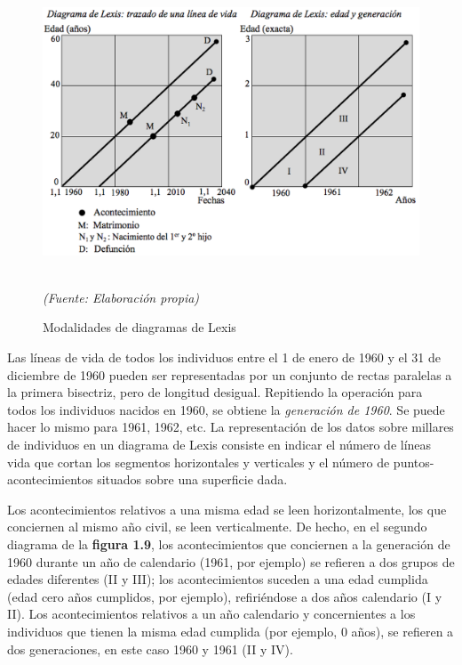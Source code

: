 \begin{figure}[!ht]
\centering
\includegraphics[scale=0.48]{Cap1/diagrlexis.png}
\caption{Modalidades de diagramas de Lexis}\\
\textit{(Fuente: Elaboraci\'on propia)}
\end{figure}

Las l\'ineas de vida de todos los individuos entre el 1 de enero de 1960 y el 31 de diciembre de 1960 pueden ser representadas por un conjunto de rectas paralelas a la primera bisectriz, pero de longitud desigual. Repitiendo la operaci\'on para todos los individuos nacidos en 1960, se obtiene la \textit{generaci\'on de 1960}. Se puede hacer lo mismo para 1961, 1962, etc. La representaci\'on de los datos sobre millares de individuos en un diagrama de Lexis consiste en indicar el n\'umero de l\'ineas vida que cortan los segmentos horizontales y verticales y el n\'umero de puntos-acontecimientos situados sobre una superficie dada.\\

\vspace{-0.3cm}

Los acontecimientos relativos a una misma edad se leen horizontalmente, los que conciernen al mismo a\~no civil, se leen verticalmente. De hecho, en el segundo diagrama de la \textbf{figura 1.9}, los acontecimientos que conciernen a la generaci\'on de 1960 durante un a\~no de calendario (1961, por ejemplo) se refieren a dos grupos de edades diferentes (II y III); los acontecimientos suceden a una edad cumplida (edad cero a\~nos cumplidos, por ejemplo), refiri\'endose a dos a\~nos calendario (I y II). Los acontecimientos relativos a un a\~no calendario y concernientes a los individuos que tienen la misma edad cumplida (por ejemplo, 0 a\~nos), se refieren a dos generaciones, en este caso 1960 y 1961 (II y IV).

